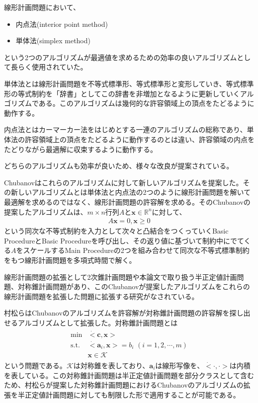 線形計画問題において、
\begin{itemize}
  \item 内点法(interior point method)
  \item 単体法(simplex method)
\end{itemize}
という2つのアルゴリズムが最適値を求めるための効率の良いアルゴリズムとして長らく使用されていた。

単体法とは線形計画問題を不等式標準形、等式標準形と変形していき、等式標準形の等式制約を「辞書」としてこの辞書を非増加となるように更新していくアルゴリズムである。このアルゴリズムは幾何的な許容領域上の頂点をたどるように動作する。

内点法とはカーマーカー法をはじめとする一連のアルゴリズムの総称であり、単体法の許容領域上の頂点をたどるように動作するのとは違い、許容領域の内点をたどりながら最適解に収束するように動作する。

どちらのアルゴリズムも効率が良いため、様々な改良が提案されている\cite{Optimization}\cite{InteriorPointMethod}。

Chubanovはこれらのアルゴリズムに対して新しいアルゴリズムを提案した\cite{Chubanov}。その新しいアルゴリズムとは単体法と内点法の2つのように線形計画問題を解いて最適解を求めるのではなく、線形計画問題の許容解を求める。そのChubanovの提案したアルゴリズムは、$m \times n$行列$A$と$\mathbf{x} \in \mathbb{R}^n$に対して、
\begin{align*}
  A \mathbf{x} = 0, \mathbf{x} \geq 0
\end{align*}
という同次な不等式制約を入力として次々と凸結合をつくっていくBasic ProcedureとBasic Procedureを呼び出し、その返り値に基づいて制約中にでてくる$A$をスケールするMain Procedureの2つを組み合わせて同次な不等式標準制約をもつ線形計画問題を多項式時間で解く。

線形計画問題の拡張として2次錐計画問題や本論文で取り扱う半正定値計画問題、対称錐計画問題があり、このChubanovが提案したアルゴリズムをこれらの線形計画問題を拡張した問題に拡張する研究がなされている\cite{SOCP}\cite{SymmetricCone}。

村松らはChubanovのアルゴリズムを許容解が対称錐計画問題の許容解を探し出せるアルゴリズムとして拡張した\cite{SymmetricCone}。対称錐計画問題とは
\begin{align*}
  \begin{array}{ll}
    \text{min}  & \dot<\mathbf{c}, \mathbf{x}> \\
    \text{s.t.} & \dot<\mathbf{a}_i, \mathbf{x}> = b_i \,\, (i = 1, 2, \cdots, m) \\
                & \mathbf{x} \in \mathcal{K}
  \end{array}
\end{align*}
という問題である。$\mathcal{K}$は対称錐を表しており、$\mathbf{a}_i$は線形写像を、$\dot<\cdot, \cdot>$は内積を表している。この対称錐計画問題は半正定値計画問題を部分クラスとして含むため、村松らが提案した対称錐計画問題におけるChubanovのアルゴリズムの拡張を半正定値計画問題に対しても制限した形で適用することが可能である。

